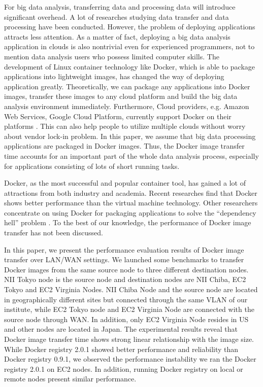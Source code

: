 \documentclass{ieicej}
\begin{document}
For big data analysis, transferring data and processing data will introduce significant overhead. A lot of researches studying data transfer and data processing have been conducted. However, the problem of deploying applications attracts less attention. As a matter of fact, deploying a big data analysis application in clouds is also nontrivial even for experienced programmers, not to mention data analysis users who possess limited computer skills. The development of Linux container technology like Docker, which is able to package applications into lightweight images, has changed the way of deploying application greatly. Theoretically, we can package any applications into Docker images, transfer these images to any cloud platform and build the big data analysis environment immediately. Furthermore, Cloud providers, e.g. Amazon Web Services, Google Cloud Platform, currently support Docker on their platforms \cite{amazon2015container,google2015container}. This can also help people to utilize multiple clouds without worry about vendor lock-in problem. In this paper, we assume that big data processing applications are packaged in Docker images. Thus, the Docker image transfer time accounts for an important part of the whole data analysis process, especially for applications consisting of lots of short running tasks.


Docker, as the most successful and popular container tool, has gained a lot of attractions from both industry and academia. Recent researches \cite{felter2014updated,tang2014performance,morabito2015hypervisors} find that Docker shows better performance than the virtual machine technology. Other researchers concentrate on using Docker for packaging applications to solve the ``dependency hell'' problem \cite{gerlach2014skyport,zheng2015integrating,boettiger2015introduction,tazro2015read}. To the best of our knowledge, the performance of Docker image transfer has not been discussed.

In this paper, we present the performance evaluation results of Docker image transfer over LAN/WAN settings. We launched some benchmarks to transfer Docker images from the same source node to three different destination nodes. NII Tokyo node is the source node and destination nodes are NII Chiba, EC2 Tokyo and EC2 Virginia Nodes. NII Chiba Node and the source node are located in geographically different sites but connected through the same VLAN of our institute, while EC2 Tokyo node and EC2 Virginia Node are connected with the source node through WAN. In addition, only EC2 Virginia Node resides in US and other nodes are located in Japan. The experimental results reveal that Docker image transfer time shows strong linear relationship with the image size. While Docker registry 2.0.1 showed better performance and reliability than Docker registry 0.9.1, we observed the performance instability we ran the Docker registry 2.0.1 on EC2 nodes. In addition, running Docker registry on local or remote nodes present similar performance.
\end{document}
